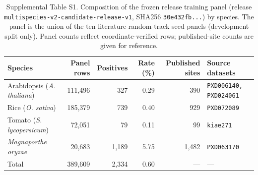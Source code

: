 \documentclass[11pt]{article}
\begin{document}
\begin{table}[h]
\caption{Supplemental Table S1. Composition of the frozen release training panel (release \texttt{multispecies-v2-candidate-release-v1}, SHA256 \texttt{30e432fb...}) by species. The panel is the union of the ten literature-random-track seed panels (development split only). Panel counts reflect coordinate-verified rows; published-site counts are given for reference.}
\label{tab:supplemental_s1}
\begin{tabular}{@{}lrrrrl@{}}
\toprule
Species & Panel rows & Positives & Rate (\%) & Published sites & Source datasets \\
\midrule
Arabidopsis (\textit{A. thaliana}) & 111,496 & 327 & 0.29 & 390 & \texttt{PXD006140, PXD024061} \\
Rice (\textit{O. sativa}) & 185,379 & 739 & 0.40 & 929 & \texttt{PXD072089} \\
Tomato (\textit{S. lycopersicum}) & 72,051 & 79 & 0.11 & 99 & \texttt{kiae271} \\
\textit{Magnaporthe oryzae} & 20,683 & 1,189 & 5.75 & 1,482 & \texttt{PXD063170} \\
\midrule
Total & 389,609 & 2,334 & 0.60 & --- & --- \\
\bottomrule
\end{tabular}
\end{table}
\end{document}
